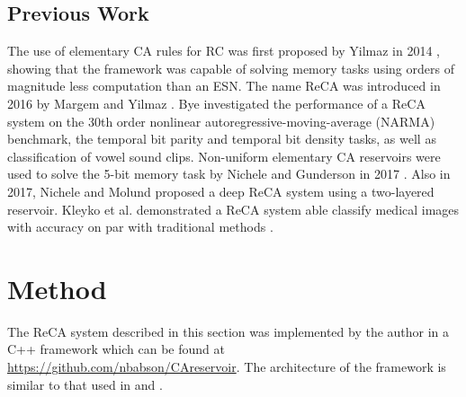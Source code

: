 \documentclass{elsarticle}
\begin{document}
\begin{multicols}{2}
\subsection{Previous Work}

The use of elementary CA rules for RC was 
   first proposed by Yilmaz in 2014 \cite{yilmaz2014reservoir}
, showing that the framework was capable of 
   solving memory tasks using orders of magnitude less computation than an ESN.
   The name ReCA was introduced in 2016 by Margem 
   and Yilmaz \cite{margem2017experimental}. Bye \cite{bye2016investigation} investigated the performance 
   of a ReCA system on the 30th order nonlinear autoregressive-moving-average 
   (NARMA) benchmark, the temporal bit parity and temporal bit density tasks, 
   as well as classification of vowel sound clips.  
      Non-uniform elementary CA reservoirs were used to solve the 5-bit memory 
      task by Nichele and Gunderson in 2017 \cite{nichele2017reservoir}. Also 
      in 2017, Nichele and Molund \cite{nichele2017deep}
proposed a deep ReCA system using a 
      two-layered reservoir. Kleyko et al. \cite{kleyko2017modality} demonstrated a ReCA system able 
      classify medical images with accuracy on par with traditional methods 
      .
 





\section{Method}\label{method}
The ReCA system described in this section was implemented by the author in a 
C++ framework which can be found at \url{https://github.com/nbabson/CAreservoir}. The 
architecture of the framework is similar to that used in  
\cite{nichele2017deep} and \cite{bye2016investigation}.


\end{multicols}
\end{document}
